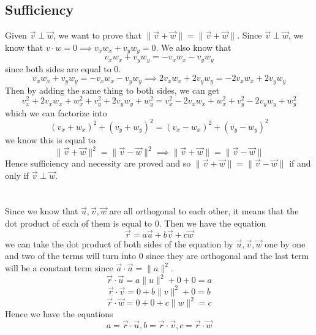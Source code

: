 \documentclass{article}
\begin{document}
\subsection{Sufficiency}
Given \(\vec{v} \perp \vec{w}\), we want to prove that \(\|\vec{v} + \vec{w}\| = \|\vec{v} + \vec{w}\|\). Since \(\vec{v} \perp \vec{w}\), we know that \(v\cdot w = 0 \implies v_xw_x + v_yw_y = 0\). We also know that 
\[v_xw_x+v_yw_y = -v_xw_x-v_yw_y\]
since both sides are equal to $0$.
\[v_xw_x+v_yw_y = -v_xw_x-v_yw_y \implies 2v_xw_x+2v_yw_y = -2v_xw_x+2v_yw_y\]
Then by adding the same thing to both sides, we can get
\[v_x^2 + 2v_x w_x + w_x^2 + v_y^2+2v_y w_y + w_y^2 = v_x^2 - 2v_xw_x+w_x^2 + v_y^2-2v_yw_y+w_y^2\]
which we can factorize into
\[(v_x + w_x)^2 + (v_y+w_y)^2 = (v_x-w_x)^2+(v_y-w_y)^2\]
we know this is equal to 
\[\|\vec{v}+\vec{w}\|^2 = \|\vec{v}-\vec{w}\|^2 \implies \|\vec{v}+\vec{w}\| = \|\vec{v} - \vec{w}\|\]
Hence sufficiency and necessity are proved and so \(\|\vec{v}+\vec{w}\| = \|\vec{v} - \vec{w}\|\) if and only if \(\vec{v} \perp \vec{w}\). 
\section{}
Since we know that \(\vec{u}, \vec{v}, \vec{w}\) are all orthogonal to each other, it means that the dot product of each of them is equal to $0$. Then we have the equation 
\[\vec{r} = a\vec{u}+b\vec{v}+c\vec{w}\]
we can take the dot product of  both sides of the equation by \(\vec{u}, \vec{v}, \vec{w}\) one by one and two of the terms will turn into $0$ since they are orthogonal and the last term will be a constant term since \(\vec{a}\cdot\vec{a} = \|a\|^2\). 
\[\vec{r}\cdot \vec{u} = a\|u\|^2+0+0 = a\]
\[\vec{r}\cdot\vec{v} = 0+ b\|v\|^2+0 =b\]
\[\vec{r}\cdot \vec{w} = 0+0+c\|w\|^2 = c\]
Hence we have the equations
\[a = \vec{r}\cdot \vec{u}, b = \vec{r}\cdot\vec{v}, c = \vec{r} \cdot \vec{w}\]
\end{document}
